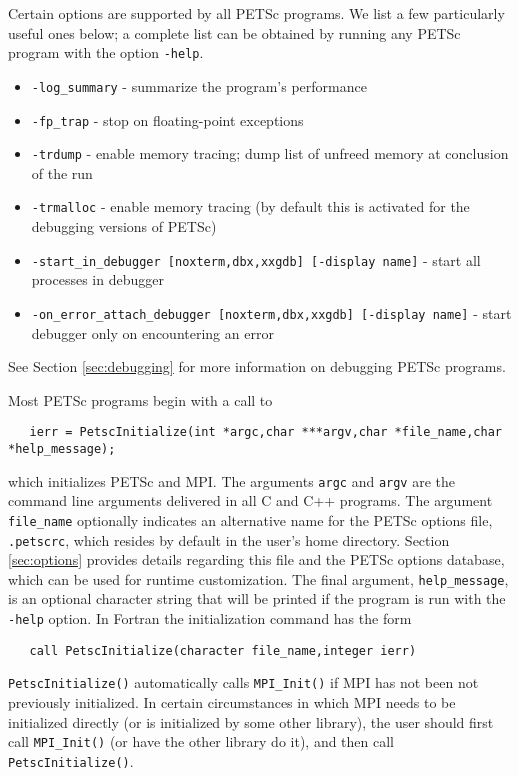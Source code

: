 Certain options are supported by all PETSc programs.  We list a few 
particularly useful ones below; a complete list can be obtained by 
running any PETSc program with the option {\tt -help}.
\begin{itemize}
\item {\tt -log\_summary} - summarize the program's performance
\item {\tt -fp\_trap} - stop on floating-point exceptions 
\item {\tt -trdump} - enable memory tracing; dump list of unfreed memory 
      at conclusion  of the run
\item {\tt -trmalloc} - enable memory tracing (by default this is 
      activated for the debugging versions of PETSc)
\item {\tt -start\_in\_debugger [noxterm,dbx,xxgdb] [-display name]} 
     - start all processes in debugger
\item {\tt -on\_error\_attach\_debugger [noxterm,dbx,xxgdb]
      [-display name]} - start debugger only on encountering an error
\end{itemize}
See Section \ref{sec:debugging} for more information on debugging PETSc programs.

Most PETSc programs begin with a call to 
\begin{verbatim}
   ierr = PetscInitialize(int *argc,char ***argv,char *file_name,char *help_message);
\end{verbatim} 
which initializes PETSc and MPI.  The arguments {\tt argc} and 
{\tt argv} are the command line arguments delivered in all C and C++
programs.  The argument {\tt file\_name}
optionally indicates an alternative name for the PETSc options file,
{\tt .petscrc}, which resides by default in the user's home directory.
Section \ref{sec:options} provides details regarding
this file and the PETSc options database, which can be used for runtime
customization. The final argument, {\tt help\_message}, is an optional
character string that will be printed if the program is run with the
{\tt -help} option.  In Fortran the initialization command has the form
\begin{verbatim}
   call PetscInitialize(character file_name,integer ierr)
\end{verbatim} 
{\tt PetscInitialize()} automatically calls {\tt MPI\_Init()} if MPI
has not been not previously initialized. In certain 
circumstances in which MPI needs to be initialized directly (or is
initialized by some other library), the user should first call 
{\tt MPI\_Init()} (or have the other library do it), and then call
{\tt PetscInitialize()}.

